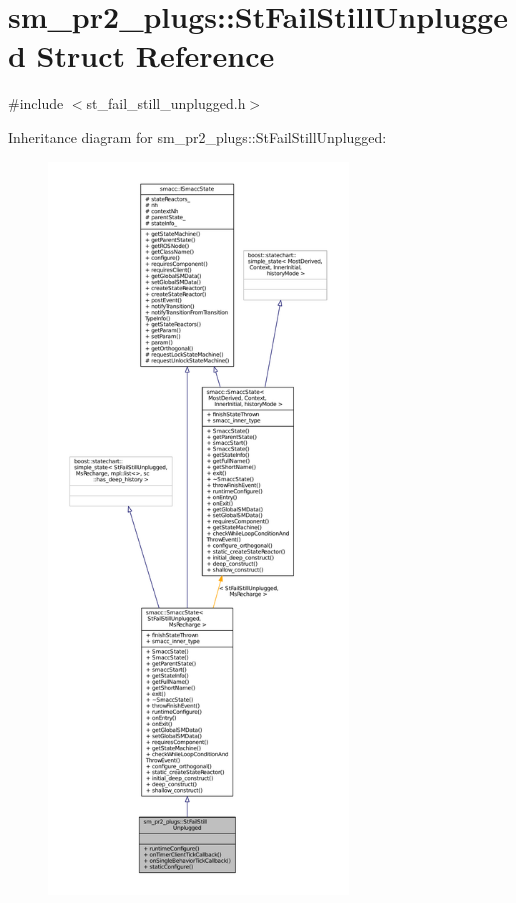\hypertarget{structsm__pr2__plugs_1_1StFailStillUnplugged}{}\section{sm\+\_\+pr2\+\_\+plugs\+:\+:St\+Fail\+Still\+Unplugged Struct Reference}
\label{structsm__pr2__plugs_1_1StFailStillUnplugged}


{\ttfamily \#include $<$st\+\_\+fail\+\_\+still\+\_\+unplugged.\+h$>$}



Inheritance diagram for sm\+\_\+pr2\+\_\+plugs\+:\+:St\+Fail\+Still\+Unplugged\+:
\nopagebreak
\begin{figure}[H]
\begin{center}
\leavevmode
\includegraphics[height=550pt]{structsm__pr2__plugs_1_1StFailStillUnplugged__inherit__graph}
\end{center}
\end{figure}


